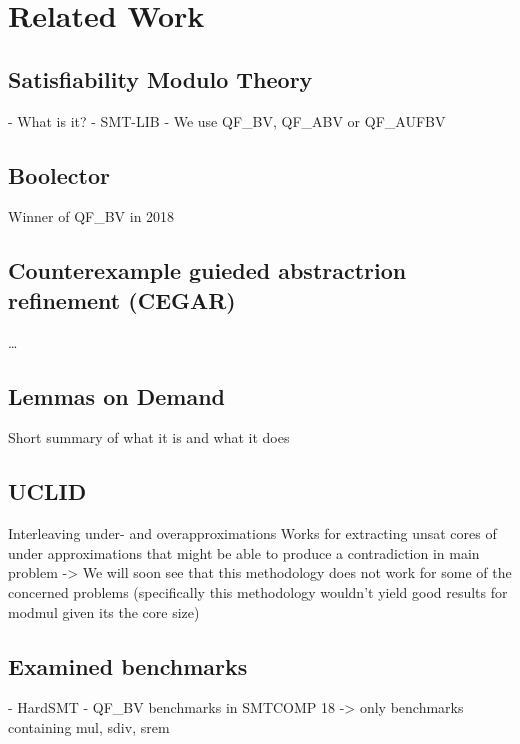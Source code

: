 \chapter{Related Work}
\label{ch:related_work}
\section{Satisfiability Modulo Theory}
- What is it?
- SMT-LIB
- We use QF\_BV, QF\_ABV or QF\_AUFBV
\section{Boolector}
Winner of QF\_BV in 2018 
\section{Counterexample guieded abstractrion refinement (CEGAR)}
\dots
\section{Lemmas on Demand}
Short summary of what it is and what it does
\section{UCLID}
Interleaving under- and overapproximations
Works for extracting unsat cores of under approximations that might be able to produce a contradiction in main problem
-> We will soon see that this methodology does not work for some of the concerned problems (specifically this methodology wouldn't yield good results for modmul given its the core size)
\section{Examined benchmarks}
- HardSMT
- QF\_BV benchmarks in SMTCOMP 18 -> only benchmarks containing mul, sdiv, srem